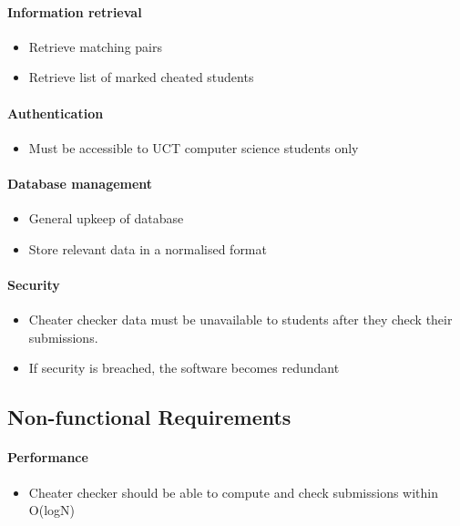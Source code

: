 \documentclass[11pt,a4paper]{article}
\begin{document}
\paragraph{Information retrieval}
\begin{itemize}
    \item Retrieve matching pairs
    \item Retrieve list of marked cheated students
\end{itemize}

\paragraph{Authentication}
\begin{itemize}
    \item Must be accessible to UCT computer science students only
\end{itemize}

\paragraph{Database management}
\begin{itemize}
    \item General upkeep of database
    \item Store relevant data in a normalised format
\end{itemize}

\paragraph{Security}
\begin{itemize}
    \item Cheater checker data must be unavailable to students after they check their submissions.
    \item If security is breached, the software becomes redundant
\end{itemize}

\subsection{Non-functional Requirements}

\paragraph{Performance}
\begin{itemize}
    \item Cheater checker should be able to compute and check submissions within O(logN) 
\end{itemize}
\end{document}
